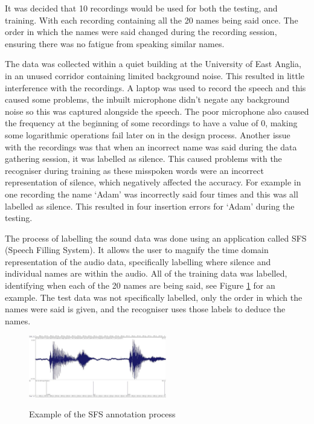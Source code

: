 \documentclass[journal]{IEEEtran}
\begin{document}
It was decided that 10 recordings would be used for both the testing, and training. With each recording containing all the 20 names being said once. The order in which the names were said changed during the recording session, ensuring there was no fatigue from speaking similar names.

The data was collected within a quiet building at the University of East Anglia, in an unused corridor containing limited background noise. This resulted in little interference with the recordings. A laptop was used to record the speech and this caused some problems, the inbuilt microphone didn't negate any background noise so this was captured alongside the speech. The poor microphone also caused the frequency at the beginning of some recordings to have a value of 0, making some logarithmic operations fail later on in the design process. Another issue with the recordings was that when an incorrect name was said during the data gathering session, it was labelled as silence. This caused problems with the recogniser during training as these misspoken words were an incorrect representation of silence, which negatively affected the accuracy. For example in one recording the name `Adam' was incorrectly said four times and this was all labelled as silence. This resulted in four insertion errors for `Adam' during the testing.

The process of labelling the sound data was done using an application called SFS (Speech Filling System). It allows the user to magnify the time domain representation of the audio data, specifically labelling where silence and individual names are within the audio. All of the training data was labelled, identifying when each of the 20 names are being said, see Figure \ref{fig:sfs} for an example. The test data was not specifically labelled, only the order in which the names were said is given, and the recogniser uses those labels to deduce the names.

\begin{figure}[!htb]
	\centering
	\captionsetup{justification=centering}
	\includegraphics[width=60mm,scale=0.5]{sfs_example.jpg}\\
	\caption{Example of the SFS annotation process}\label{fig:sfs}
\end{figure}
\end{document}
